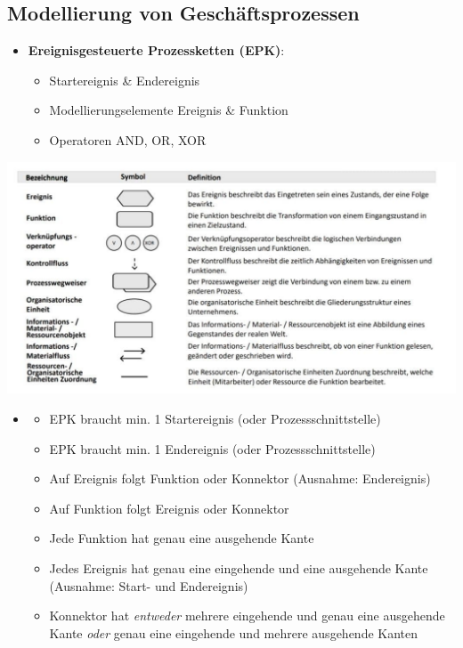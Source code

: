 \documentclass[12pt,a4paper]{article}
\begin{document}
\vspace*{0.5cm}
\subsection{Modellierung von Geschäftsprozessen} %
\begin{itemize}
   \item \textbf{Ereignisgesteuerte Prozessketten (EPK)}:
       \begin{itemize}
		   \item Startereignis \& Endereignis
		   \item Modellierungselemente Ereignis \& Funktion
		   \item Operatoren AND, OR, XOR
		\end{itemize}
\end{itemize}

\vspace*{-0.8cm}
\begin{center}
    \includegraphics[width=1.05\textwidth]{digi2.jpg}
\end{center}

\begin{itemize}
\item []
   \begin{itemize}
      \item EPK braucht min. 1 Startereignis (oder Prozessschnittstelle)
	   \item EPK braucht min. 1 Endereignis (oder Prozessschnittstelle)
	   \item Auf Ereignis folgt Funktion oder Konnektor (Ausnahme: Endereignis)
	   \item Auf Funktion folgt Ereignis oder Konnektor
	   \item Jede Funktion hat genau eine ausgehende Kante
	   \item Jedes Ereignis hat genau eine eingehende und eine ausgehende Kante (Ausnahme: Start- und Endereignis)
	   \item Konnektor hat \textit{entweder} mehrere eingehende und genau eine ausgehende Kante 
	         \textit{oder} genau eine eingehende und mehrere ausgehende Kanten
   \end{itemize}
\end{itemize}
\end{document}
